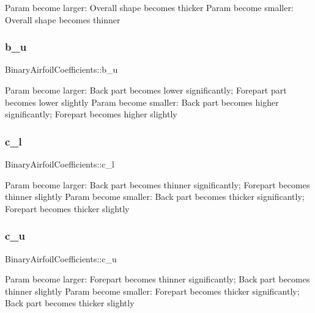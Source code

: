 Param become larger\+: Overall shape becomes thicker Param become smaller\+: Overall shape becomes thinner \hypertarget{struct_binary_airfoil_coefficients_adadc9038b8731917b4dbcabd776b6627}{}\label{struct_binary_airfoil_coefficients_adadc9038b8731917b4dbcabd776b6627} 
\subsubsection{\texorpdfstring{b\+\_\+u}{b\_u}}
{\footnotesize\ttfamily Binary\+Airfoil\+Coefficients\+::b\+\_\+u}

Param become larger\+: Back part becomes lower significantly; Forepart part becomes lower slightly Param become smaller\+: Back part becomes higher significantly; Forepart becomes higher slightly \hypertarget{struct_binary_airfoil_coefficients_a0c5c811277770502ff707312b5289601}{}\label{struct_binary_airfoil_coefficients_a0c5c811277770502ff707312b5289601} 
\subsubsection{\texorpdfstring{c\+\_\+l}{c\_l}}
{\footnotesize\ttfamily Binary\+Airfoil\+Coefficients\+::c\+\_\+l}

Param become larger\+: Back part becomes thinner significantly; Forepart becomes thinner slightly Param become smaller\+: Back part becomes thicker significantly; Forepart becomes thicker slightly \hypertarget{struct_binary_airfoil_coefficients_a9de0fabddae28b4d649a256c19137eb4}{}\label{struct_binary_airfoil_coefficients_a9de0fabddae28b4d649a256c19137eb4} 
\subsubsection{\texorpdfstring{c\+\_\+u}{c\_u}}
{\footnotesize\ttfamily Binary\+Airfoil\+Coefficients\+::c\+\_\+u}

Param become larger\+: Forepart becomes thinner significantly; Back part becomes thinner slightly Param become smaller\+: Forepart becomes thicker significantly; Back part becomes thicker slightly \hypertarget{struct_binary_airfoil_coefficients_a8b911d241a95f63e79813747ba2c25e6}{}\label{struct_binary_airfoil_coefficients_a8b911d241a95f63e79813747ba2c25e6} 
